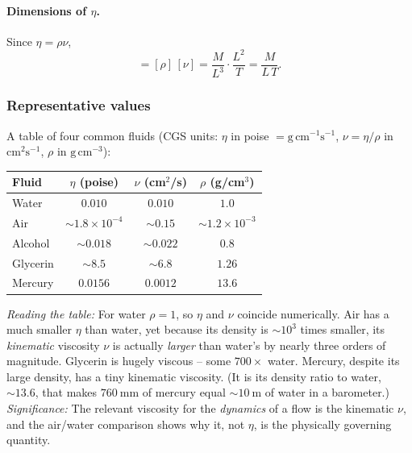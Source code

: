 \documentclass[../main.tex]{subfiles}
\begin{document}
\paragraph{Dimensions of $\eta$.} Since $\eta=\rho\nu$,
\begin{equation}
  [\eta] = [\rho]\,[\nu] = \frac{M}{L^3}\cdot\frac{L^2}{T} = \frac{M}{L\,T}.
  \label{eq:lec18_eta_dim}
\end{equation}


\subsubsection*{Representative values}
A table of four common fluids (CGS units: $\eta$ in poise $=\mathrm{g\,cm^{-1}s^{-1}}$, $\nu=\eta/\rho$ in $\mathrm{cm^2 s^{-1}}$, $\rho$ in $\mathrm{g\,cm^{-3}}$):
\begin{center}
\begin{tabular}{lccc}
\toprule
Fluid & $\eta$ (poise) & $\nu$ (cm$^2$/s) & $\rho$ (g/cm$^3$) \\
\midrule
Water    & $0.010$ & $0.010$ & $1.0$ \\
Air      & $\sim1.8\times10^{-4}$ & $\sim0.15$ & $\sim1.2\times10^{-3}$ \\
Alcohol  & $\sim0.018$ & $\sim0.022$ & $0.8$ \\
Glycerin & $\sim8.5$ & $\sim6.8$ & $1.26$ \\
Mercury  & $0.0156$ & $0.0012$ & $13.6$ \\
\bottomrule
\end{tabular}
\end{center}
\textit{Reading the table:} For water $\rho=1$, so $\eta$ and $\nu$ coincide numerically. Air has a much smaller $\eta$ than water, yet because its density is $\sim10^3$ times smaller, its \emph{kinematic} viscosity $\nu$ is actually \emph{larger} than water's by nearly three orders of magnitude. Glycerin is hugely viscous -- some $700\times$ water. Mercury, despite its large density, has a tiny kinematic viscosity. (It is its density ratio to water, $\sim13.6$, that makes $760\ \mathrm{mm}$ of mercury equal $\sim10\ \mathrm{m}$ of water in a barometer.)
\textit{Significance:} The relevant viscosity for the \emph{dynamics} of a flow is the kinematic $\nu$, and the air/water comparison shows why it, not $\eta$, is the physically governing quantity.
\end{document}
